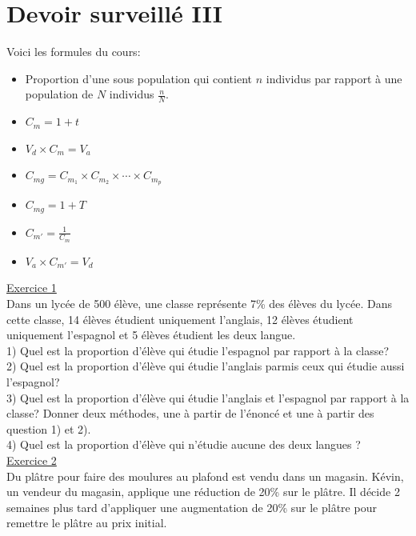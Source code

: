 \documentclass[french]{book}
\begin{document}
\thispagestyle{empty}

\section*{Devoir surveillé III}

Voici les formules du cours: 
\begin{itemize}
\item Proportion d'une sous population qui contient $n$ individus  par rapport à une population de $N$ individus $\frac{n}{N}$.
\item $C_m=1+t$
\item $V_d \times C_m= V_a $
\item $C_{mg}=C_{m_1} \times C_{m_2} \times \cdots \times C_{m_p}$
\item $C_{mg}=1+T$
\item $C_{m'}=\frac{1}{C_m}$
\item $V_a \times C_{m'}= V_d $\\

\end{itemize}

\underline{Exercice 1}\\


Dans un lycée de 500 élève, une classe représente 7\% des élèves du lycée. Dans cette classe, 14 élèves étudient uniquement l’anglais, 12 élèves étudient uniquement l’espagnol et 5 élèves étudient les deux langue.\\


1) Quel est la proportion d'élève qui étudie l'espagnol par rapport à la classe?\\

2) Quel est la proportion d'élève qui étudie l'anglais parmis ceux qui étudie aussi l'espagnol?\\

3) Quel est la proportion d'élève qui étudie l'anglais et l'espagnol par rapport à la classe? Donner deux méthodes, une à partir de l'énoncé et une à partir des question 1) et 2).\\

4) Quel est la proportion d'élève qui n'étudie aucune des deux langues ?\\

\underline{Exercice 2}\\

Du plâtre pour faire des moulures au plafond est vendu dans un magasin. Kévin, un vendeur du magasin, applique une réduction de 20\% sur le plâtre. Il décide 2 semaines plus tard d'appliquer une augmentation de 20\% sur le plâtre pour remettre le plâtre au prix initial. \\
\end{document}
